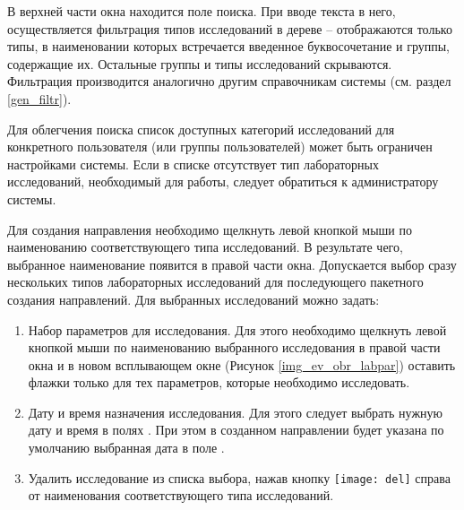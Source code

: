 В верхней части окна находится поле поиска. При вводе текста в него, осуществляется фильтрация типов исследований в дереве -- отображаются только типы, в наименовании которых встречается введенное буквосочетание и группы, содержащие их. Остальные  группы и типы исследований скрываются. Фильтрация производится аналогично другим справочникам системы (см. раздел \ref{gen_filtr}). 



\begin{prim}
 Для облегчения поиска список доступных категорий исследований для конкретного пользователя (или группы пользователей) может быть ограничен настройками системы. Если в списке отсутствует тип лабораторных исследований, необходимый для работы, следует обратиться к администратору системы.
\end{prim} 

Для создания направления необходимо щелкнуть левой кнопкой мыши по наименованию соответствующего типа исследований. В результате чего, выбранное наименование появится в правой части окна. Допускается выбор сразу нескольких типов лабораторных исследований для последующего пакетного создания направлений. Для выбранных исследований можно задать:

\begin{enumerate}
 \item Набор параметров для исследования. Для этого необходимо щелкнуть левой кнопкой мыши по наименованию выбранного исследования в правой части окна и в новом всплывающем окне (Рисунок \ref{img_ev_obr_labpar}) оставить флажки только для тех параметров, которые необходимо исследовать.
 \item Дату и время назначения исследования. Для этого следует выбрать нужную дату и время в полях . При этом в созданном направлении будет указана по умолчанию выбранная дата в поле . 
 \item Удалить исследование из списка выбора, нажав кнопку \texttt{[image: del]} справа от наименования соответствующего типа исследований.
\end{enumerate}

